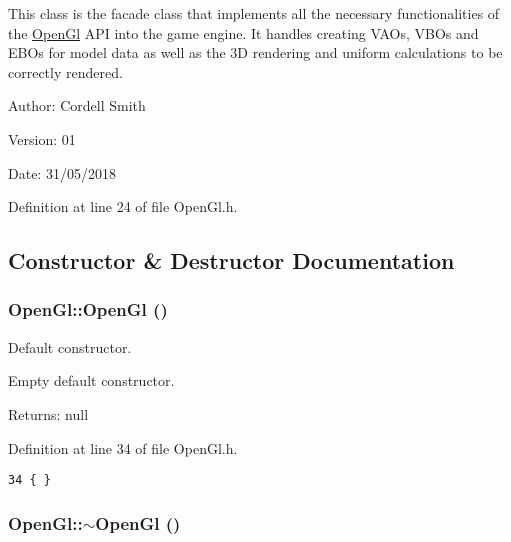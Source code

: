 This class is the facade class that implements all the necessary functionalities of the \hyperlink{class_open_gl}{OpenGl} API into the game engine. It handles creating VAOs, VBOs and EBOs for model data as well as the 3D rendering and uniform calculations to be correctly rendered.

\begin{Desc}
\item[Author:]Cordell Smith \end{Desc}
\begin{Desc}
\item[Version:]01 \end{Desc}
\begin{Desc}
\item[Date:]31/05/2018 \end{Desc}


Definition at line 24 of file OpenGl.h.

\subsection{Constructor \& Destructor Documentation}
\hypertarget{class_open_gl_2daf1eb44fca97158f61ec6858cad898}{
\subsubsection[OpenGl]{\setlength{\rightskip}{0pt plus 5cm}OpenGl::OpenGl ()}}
\label{class_open_gl_2daf1eb44fca97158f61ec6858cad898}


Default constructor. 

Empty default constructor.

\begin{Desc}
\item[Returns:]null \end{Desc}


Definition at line 34 of file OpenGl.h.

\begin{Code}\begin{verbatim}34 { }
\end{verbatim}
\end{Code}


\hypertarget{class_open_gl_7c5d27fb02db6c5d7d77f8b6be2f776e}{
\subsubsection[$\sim$OpenGl]{\setlength{\rightskip}{0pt plus 5cm}OpenGl::$\sim$OpenGl ()}}
\label{class_open_gl_7c5d27fb02db6c5d7d77f8b6be2f776e}


